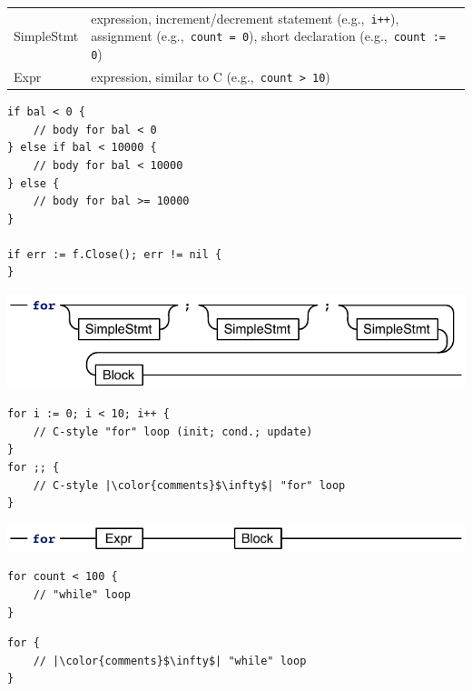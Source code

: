 \documentclass{article}
\begin{document}
\begin{multicols*}{3}
  \begin{tabular}{p{0.6in}p{2.4in}}
    SimpleStmt & expression, increment/decrement statement (e.g.,~\lstinline!i++!), assignment (e.g.,~\lstinline!count = 0!), short declaration (e.g.,~\lstinline!count := 0!)\\
    Expr & expression, similar to C (e.g.,~\lstinline!count > 10!)\\
  \end{tabular}

  \vspace{\baselineskip}
\begin{lstlisting}[frame=single,escapechar=|]
if bal < 0 {
    // body for bal < 0
} else if bal < 10000 {
    // body for bal < 10000
} else {
    // body for bal >= 10000
}

if err := f.Close(); err != nil {
}
\end{lstlisting}

  \filbreak
  \includegraphics[width=\linewidth]{for-3parts}

\begin{lstlisting}[frame=single,escapechar=|]
for i := 0; i < 10; i++ {
    // C-style "for" loop (init; cond.; update)
}
for ;; {
    // C-style |\color{comments}$\infty$| "for" loop
}
\end{lstlisting}

  \filbreak
  \includegraphics[width=\linewidth]{for-1cond}

  \begin{minipage}{0.47\linewidth}
\begin{lstlisting}[frame=single,escapechar=|]
for count < 100 {
    // "while" loop
}
\end{lstlisting}
  \end{minipage}\hfill%
  \begin{minipage}{0.47\linewidth}
\begin{lstlisting}[frame=single,escapechar=|]
for {
    // |\color{comments}$\infty$| "while" loop
}
\end{lstlisting}
  \end{minipage}


\end{multicols*}
\end{document}
